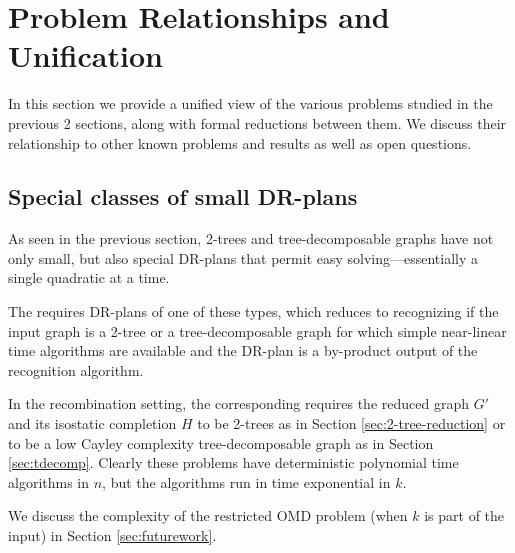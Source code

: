 \section{Problem Relationships and Unification}
\label{sec:table}

In this section we provide a unified view of the various problems studied in the previous 2 sections, along with formal reductions between them. We discuss their relationship to other known problems and results as well as open questions.





\subsection{Special classes of small DR-plans}
As seen in the previous section, 2-trees and tree-decomposable graphs have not only small, but also special DR-plans that permit easy solving---essentially a single quadratic at a time.

The  requires DR-plans of one of these types, which reduces to recognizing if the input graph is a 2-tree or a tree-decomposable graph for which simple near-linear time algorithms are available \cite{valdes1979recognition,fudos1997graph} and the DR-plan is a by-product output of the recognition algorithm.

In the recombination setting, the corresponding  requires the reduced graph $G'$ and its isostatic completion $H$ to be 2-trees as in Section \ref{sec:2-tree-reduction} or to be a low Cayley complexity tree-decomposable graph as in Section \ref{sec:tdecomp}. Clearly these problems have deterministic polynomial time algorithms in $n$, but the algorithms run in time exponential in $k$.

We discuss the complexity of the restricted OMD problem (when $k$ is part of the input) in Section \ref{sec:futurework}.

